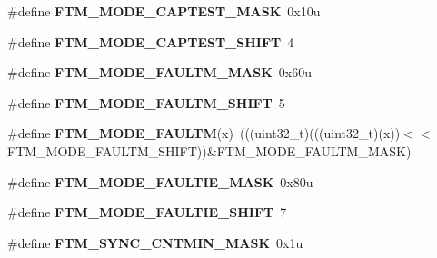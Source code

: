 \begin{DoxyCompactItemize}
\item 
\#define {\bfseries F\+T\+M\+\_\+\+M\+O\+D\+E\+\_\+\+C\+A\+P\+T\+E\+S\+T\+\_\+\+M\+A\+SK}~0x10u\hypertarget{group__FTM__Register__Masks_ga24f1ea5d7afd4ec88404e4867303aae5}{}\label{group__FTM__Register__Masks_ga24f1ea5d7afd4ec88404e4867303aae5}

\item 
\#define {\bfseries F\+T\+M\+\_\+\+M\+O\+D\+E\+\_\+\+C\+A\+P\+T\+E\+S\+T\+\_\+\+S\+H\+I\+FT}~4\hypertarget{group__FTM__Register__Masks_gab95eb2088da81d610805b949399d9bf9}{}\label{group__FTM__Register__Masks_gab95eb2088da81d610805b949399d9bf9}

\item 
\#define {\bfseries F\+T\+M\+\_\+\+M\+O\+D\+E\+\_\+\+F\+A\+U\+L\+T\+M\+\_\+\+M\+A\+SK}~0x60u\hypertarget{group__FTM__Register__Masks_ga8a3aedea37d5334fda2212d1f1424ce4}{}\label{group__FTM__Register__Masks_ga8a3aedea37d5334fda2212d1f1424ce4}

\item 
\#define {\bfseries F\+T\+M\+\_\+\+M\+O\+D\+E\+\_\+\+F\+A\+U\+L\+T\+M\+\_\+\+S\+H\+I\+FT}~5\hypertarget{group__FTM__Register__Masks_ga64d6ed5f33ee34eccdb66956a0bc1224}{}\label{group__FTM__Register__Masks_ga64d6ed5f33ee34eccdb66956a0bc1224}

\item 
\#define {\bfseries F\+T\+M\+\_\+\+M\+O\+D\+E\+\_\+\+F\+A\+U\+L\+TM}(x)~(((uint32\+\_\+t)(((uint32\+\_\+t)(x))$<$$<$F\+T\+M\+\_\+\+M\+O\+D\+E\+\_\+\+F\+A\+U\+L\+T\+M\+\_\+\+S\+H\+I\+FT))\&F\+T\+M\+\_\+\+M\+O\+D\+E\+\_\+\+F\+A\+U\+L\+T\+M\+\_\+\+M\+A\+SK)\hypertarget{group__FTM__Register__Masks_gae199f2cb5b5206cfc5fd06f4ad420759}{}\label{group__FTM__Register__Masks_gae199f2cb5b5206cfc5fd06f4ad420759}

\item 
\#define {\bfseries F\+T\+M\+\_\+\+M\+O\+D\+E\+\_\+\+F\+A\+U\+L\+T\+I\+E\+\_\+\+M\+A\+SK}~0x80u\hypertarget{group__FTM__Register__Masks_gab5bf6d3a31e69bc7806947c4650afa90}{}\label{group__FTM__Register__Masks_gab5bf6d3a31e69bc7806947c4650afa90}

\item 
\#define {\bfseries F\+T\+M\+\_\+\+M\+O\+D\+E\+\_\+\+F\+A\+U\+L\+T\+I\+E\+\_\+\+S\+H\+I\+FT}~7\hypertarget{group__FTM__Register__Masks_gac8de910f0297704ac0625948d59856d6}{}\label{group__FTM__Register__Masks_gac8de910f0297704ac0625948d59856d6}

\item 
\#define {\bfseries F\+T\+M\+\_\+\+S\+Y\+N\+C\+\_\+\+C\+N\+T\+M\+I\+N\+\_\+\+M\+A\+SK}~0x1u\hypertarget{group__FTM__Register__Masks_gaee5f107bf44191de4f5e747d4764e3ed}{}\label{group__FTM__Register__Masks_gaee5f107bf44191de4f5e747d4764e3ed}


\end{DoxyCompactItemize}
